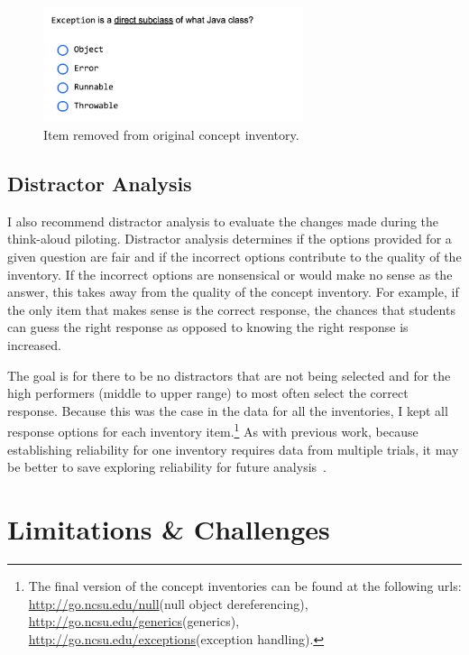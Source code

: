 	
	\begin{figure}[]
		\centering
		\includegraphics[width=3in]{Chapter-5/figs/item3.png}
		\caption{Item removed from original concept inventory. \label{fig:item3}}
	\end{figure}

\subsection{Distractor Analysis}
I also recommend distractor analysis to evaluate the changes made during the think-aloud piloting. Distractor analysis determines if the options provided for a given question are fair and if the incorrect options contribute to the quality of the inventory. If the incorrect options are nonsensical or would make no sense as the answer, this takes away from the quality of the concept inventory. For example, if the only item that makes sense is the correct response, the chances that students can guess the right response as opposed to knowing the right response is increased.

The goal is for there to be no distractors that are not being selected and for the high performers (middle to upper range) to most often select the correct response. Because this was the case in the data for all the inventories, I kept all response options for each inventory item.\footnote{The final version of the concept inventories can be found at the following urls: \url{http://go.ncsu.edu/null}(null object dereferencing), \url{http://go.ncsu.edu/generics}(generics), \url{http://go.ncsu.edu/exceptions}(exception handling).}
As with previous work, because establishing reliability for one inventory requires data from multiple trials, it may be better to save exploring reliability for future analysis~\cite{tew2010developing,tew2010assessing}.


	


\section{Limitations \& Challenges}\label{sec:limits}

